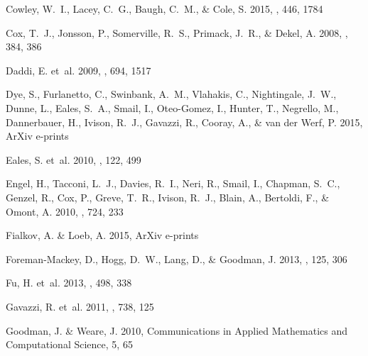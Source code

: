 \documentclass[iop]{emulateapj}
\begin{document}
\begin{thebibliography}{106}
{Cowley}, W.~I., {Lacey}, C.~G., {Baugh}, C.~M., \& {Cole}, S. 2015, \mnras,
  446, 1784

{Cox}, T.~J., {Jonsson}, P., {Somerville}, R.~S., {Primack}, J.~R., \& {Dekel},
  A. 2008, \mnras, 384, 386

{Daddi}, E. {et~al.} 2009, \apj, 694, 1517

{Dye}, S., {Furlanetto}, C., {Swinbank}, A.~M., {Vlahakis}, C., {Nightingale},
  J.~W., {Dunne}, L., {Eales}, S.~A., {Smail}, I., {Oteo-Gomez}, I., {Hunter},
  T., {Negrello}, M., {Dannerbauer}, H., {Ivison}, R.~J., {Gavazzi}, R.,
  {Cooray}, A., \& {van der Werf}, P. 2015, ArXiv e-prints

{Eales}, S. {et~al.} 2010, \pasp, 122, 499

{Engel}, H., {Tacconi}, L.~J., {Davies}, R.~I., {Neri}, R., {Smail}, I.,
  {Chapman}, S.~C., {Genzel}, R., {Cox}, P., {Greve}, T.~R., {Ivison}, R.~J.,
  {Blain}, A., {Bertoldi}, F., \& {Omont}, A. 2010, \apj, 724, 233

{Fialkov}, A. \& {Loeb}, A. 2015, ArXiv e-prints

{Foreman-Mackey}, D., {Hogg}, D.~W., {Lang}, D., \& {Goodman}, J. 2013, \pasp,
  125, 306

{Fu}, H. {et~al.} 2013, \nat, 498, 338

{Gavazzi}, R. {et~al.} 2011, \apj, 738, 125

{Goodman}, J. \& {Weare}, J. 2010, Communications in Applied Mathematics and
  Computational Science, 5, 65


\end{thebibliography}
\end{document}
